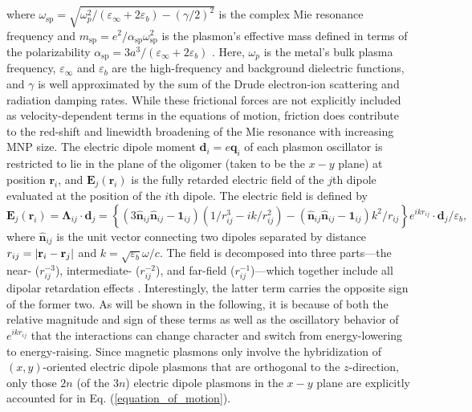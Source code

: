\documentclass [11pt, proquest] {uwthesis}[2016/11/22]
\begin{document}
where $\omega_{\textrm{sp}}=\sqrt{\omega_{p}^2/(\varepsilon_\infty+2\varepsilon_b)-(\gamma/2)^2}$ is the complex Mie resonance frequency and $m_{\textrm{sp}} = e^2/\alpha_{\textrm{sp}}\omega_{\textrm{sp}}^2$ is the plasmon's effective mass defined in terms of the polarizability $\alpha_{\textrm{sp}} = 3a^3/(\varepsilon_{\infty} + 2\varepsilon_b)$ \cite{Cherqui2014}. Here, $\omega_p$ is the metal's bulk plasma frequency, $\varepsilon_{\infty}$ and $\varepsilon_b$ are the high-frequency and background dielectric functions, and $\gamma$ is well approximated by the sum of the Drude electron-ion scattering and radiation damping rates. While these frictional forces are not explicitly included as velocity-dependent terms in the equations of motion, friction does contribute to the red-shift and linewidth broadening of the Mie resonance with increasing MNP size. The electric dipole moment $\textbf{d}_i = e\textbf{q}_i$ of each plasmon oscillator is restricted to lie in the plane of the oligomer (taken to be the $x-y$ plane) at position $\textbf{r}_i$, and $\textbf{E}_j(\textbf{r}_i)$ is the fully retarded electric field of the $j$th dipole evaluated at the position of the $i$th dipole. The electric field is defined by $\textbf{E}_j(\textbf{r}_i) = \boldsymbol{\Lambda}_{ij}\cdot\textbf{d}_j= \left\{\left(3\hat{\textbf{n}}_{ij}\hat{\textbf{n}}_{ij} - \textbf{1}_{ij}\right)\left({1}/{r_{ij}^3} - {ik}/{r_{ij}^2}\right) - \left(\hat{\textbf{n}}_{ij}\hat{\textbf{n}}_{ij} - \textbf{1}_{ij}\right)k^2/r_{ij}\right\}e^{ikr_{ij}}\cdot\textbf{d}_j/\varepsilon_b,$ where $\hat{\textbf{n}}_{ij}$ is the unit vector connecting two dipoles separated by distance $r_{ij}=|{\bf r}_i-{\bf r}_j|$ and $k=\sqrt{\varepsilon_b}\omega/c.$ The field is decomposed into three parts---the near- ($r_{ij}^{-3}$), intermediate- ($r_{ij}^{-2}$), and far-field ($r_{ij}^{-1}$)---which together include all dipolar retardation effects \cite{Purcell1973}. Interestingly, the latter term carries the opposite sign of the former two. As will be shown in the following, it is because of both the relative magnitude and sign of these terms as well as the oscillatory behavior of $e^{ikr_{ij}}$ that the interactions can change character and switch from energy-lowering to energy-raising. Since magnetic plasmons only involve the hybridization of $(x,y)$-oriented electric dipole plasmons that are orthogonal to the $z$-direction, only those $2n$ (of the $3n$) electric dipole plasmons in the $x-y$ plane are explicitly accounted for in Eq. (\ref{equation_of_motion}).
\end{document}
